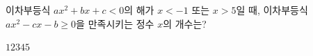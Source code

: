 이차부등식 $ax^2+bx+c<0$의 해가 $x<-1$ 또는 $x>5$일 때, 이차부등식 $ax^2-cx-b\ge 0$을 만족시키는 정수 $x$의 개수는? 
\begin{choices32}{$1$}{$2$}{$3$}{$4$}{$5$}\end{choices32}
